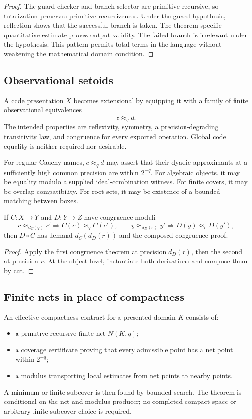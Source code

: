 \begin{proof}
The guard checker and branch selector are primitive recursive, so totalization preserves primitive recursiveness.  Under the guard hypothesis, reflection shows that the successful branch is taken.  The theorem-specific quantitative estimate proves output validity.  The failed branch is irrelevant under the hypothesis.  This pattern permits total terms in the language without weakening the mathematical domain condition.
\end{proof}

\subsection{Observational setoids}

A code presentation \(X\) becomes extensional by equipping it with a family of finite observational equivalences
\[
 c\approx_q d.
\]
The intended properties are reflexivity, symmetry, a precision-degrading transitivity law, and congruence for every exported operation.  Global code equality is neither required nor desirable.

For regular Cauchy names, \(c\approx_qd\) may assert that their dyadic approximants at a sufficiently high common precision are within \(2^{-q}\).  For algebraic objects, it may be equality modulo a supplied ideal-combination witness.  For finite covers, it may be overlap compatibility.  For root sets, it may be existence of a bounded matching between boxes.

\begin{theorem}
If \(C:X\to Y\) and \(D:Y\to Z\) have congruence moduli
\[
 c\approx_{d_C(q)}c'\Rightarrow C(c)\approx_q C(c'),
 \qquad
 y\approx_{d_D(r)}y'\Rightarrow D(y)\approx_rD(y'),
\]
then \(D\circ C\) has demand \(d_C(d_D(r))\) and the composed congruence proof.
\end{theorem}

\begin{proof}
Apply the first congruence theorem at precision \(d_D(r)\), then the second at precision \(r\).  At the object level, instantiate both derivations and compose them by cut.
\end{proof}

\subsection{Finite nets in place of compactness}

An effective compactness contract for a presented domain \(K\) consists of:
\begin{itemize}
  \item a primitive-recursive finite net \(N(K,q)\);
  \item a coverage certificate proving that every admissible point has a net point within \(2^{-q}\);
  \item a modulus transporting local estimates from net points to nearby points.
\end{itemize}
A minimum or finite subcover is then found by bounded search.  The theorem is conditional on the net and modulus producer; no completed compact space or arbitrary finite-subcover choice is required.

